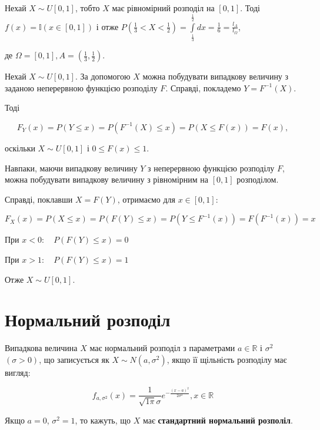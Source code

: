 \beautifulImage

\begin{example}
    Нехай $X \sim U[0, 1]$, тобто $X$ має рівномірний розподіл на $[0, 1]$.
    Тоді $f(x) = \mathbb{I}(x \in [0, 1])$ і отже
    $P(\frac{1}{3} < X < \frac{1}{2}) = \int\limits_{\frac{1}{3}}^{\frac{1}{2}} dx = \frac{1}{6} = \frac{l_A}{l_{\Omega}}$, 
    
    де $\Omega = [0, 1], A = (\frac{1}{3}, \frac{1}{2})$.
    
    \beautifulImage
\end{example}

Нехай $X \sim U[0, 1]$. За допомогою $X$ можна побудувати випадкову величину з
заданою неперервною функцією розподілу $F$. Справді, покладемо $Y = F^{-1}(X)$.

Тоді 

$$F_Y(x) = P(Y \leqslant x)
= P(F^{-1}(X) \leqslant x)
= P(X \leqslant F(x))
= F(x),$$

оскільки $X \sim U[0, 1]$ і $0 \leqslant F(x) \leqslant 1$.

Навпаки, маючи випадкову величину $Y$ з неперервною функцією розподілу
$F$, можна побудувати випадкову величину з рівномірним на $[0, 1]$
розподілом.

Справді, поклавши $X = F(Y)$, отримаємо для $x \in [0, 1]$:

$$F_X(x) = P(X \leqslant x)
= P(F(Y) \leqslant x)
= P(Y \leqslant F^{-1}(x))
= F(F^{-1}(x))
= x$$

При $x < 0: \quad P(F(Y) \leqslant x) = 0$

При $x > 1: \quad P(F(Y) \leqslant x) = 1$

Отже $X \sim U[0, 1]$.

\section{Нормальний розподіл}

Випадкова величина $X$ має нормальний розподіл з параметрами $a \in \mathbb{R}$
і $\sigma^2$ $(\sigma > 0)$, що записується як $X \sim N(a, \sigma^2)$,
якщо її щільність розподілу має вигляд:

\begin{equation}
    f_{a, \sigma^2}(x) = \frac{1}{\sqrt{1\pi} \sigma} e^{-\frac{(x-a)^2}{2\sigma^2}},
    x \in \mathbb{R}
\end{equation}

Якщо $a = 0$, $\sigma^2 = 1$, то кажуть, що $X$ має \textbf{стандартний нормальний розполіл}.

